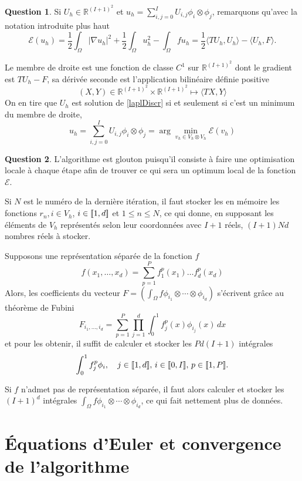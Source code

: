 \documentclass[11pt]{article}
\newcommand{\RR}{\mathbb{R}}
\DeclarePairedDelimiter{\zintcc}{[\![}{]\!]}
\theoremstyle{definition}
\newtheorem{ques}{Question}
\theoremstyle{plain}
\begin{document}
\begin{ques}
Si $U_h\in \RR^{(I+1)^2}$ et $u_h = \sum_{i,j=0}^I U_{i,j}\phi_i\otimes\phi_j$, remarquons qu'avec la notation introduite plus haut
\[
\mathcal{E}(u_h) = \frac 12\int_\Omega |\nabla u_h|^2 + \frac 12\int_\Omega u_h^2 - \int_\Omega fu_h = \frac 12\langle TU_h,U_h\rangle - \langle U_h,F\rangle.
\]

Le membre de droite est une fonction de classe $C^1$ sur $\RR^{(I+1)^2}$ dont le gradient est $TU_h - F$, sa dérivée seconde est l'application bilinéaire définie positive
\[
(X,Y)\in \RR^{(I+1)^2}\times \RR^{(I+1)^2} \longmapsto \langle TX,Y\rangle
\]
On en tire que $U_h$ est solution de \eqref{laplDiscr} si et seulement si c'est un minimum du membre de droite, 
\begin{equation}
u_h = \sum_{i,j=0}^I U_{i,j}\phi_i\otimes\phi_j = \arg\min_{v_h\in V_h\otimes V_h}\mathcal{E}(v_h)
\end{equation}
\end{ques}


\begin{ques}
L'algorithme est glouton puisqu'il consiste à faire une optimisation locale à chaque étape afin de trouver ce qui sera un optimum local de la fonction $\mathcal E$.

Si $N$ est le numéro de la dernière itération, il faut stocker les en mémoire les fonctions $r_n,i\in V_h$, $i\in\zintcc{1,d}$ et $1\leq n\leq N$, ce qui donne, en supposant les éléments de $V_h$ représentés selon leur coordonnées avec $I+1$ réels, $(I+1)Nd$ nombres réels à stocker.

Supposons une représentation séparée de la fonction $f$
\[
f(x_1,\ldots,x_d) = \sum_{p=1}^{P} f_1^p(x_1)\ldots f_d^p(x_d)
\]
Alors, les coefficients du vecteur $F = (\int_\Omega f\phi_{i_1}\otimes\cdots\otimes\phi_{i_d})$ s'écrivent grâce au théorème de Fubini
\[
F_{i_1,\ldots,i_d} = \sum_{p=1}^P\prod_{j=1}^{d}\int_0^1 f_j^p(x)\phi_{i_j}(x)\,dx
\]
et pour les obtenir, il suffit de calculer et stocker les $Pd(I+1)$ intégrales
\[
\int_0^1 f_j^p\phi_i,\quad j\in\zintcc{1,d},\,i\in\zintcc{0,I},\,p\in\zintcc{1,P}.
\]

Si $f$ n'admet pas de représentation séparée, il faut alors calculer et stocker les $(I+1)^d$ intégrales $\int_\Omega f\phi_{i_1}\otimes\cdots\otimes\phi_{i_d}$, ce qui fait nettement plus de données.
\end{ques}

\section{Équations d'Euler et convergence de l'algorithme}
\end{document}

